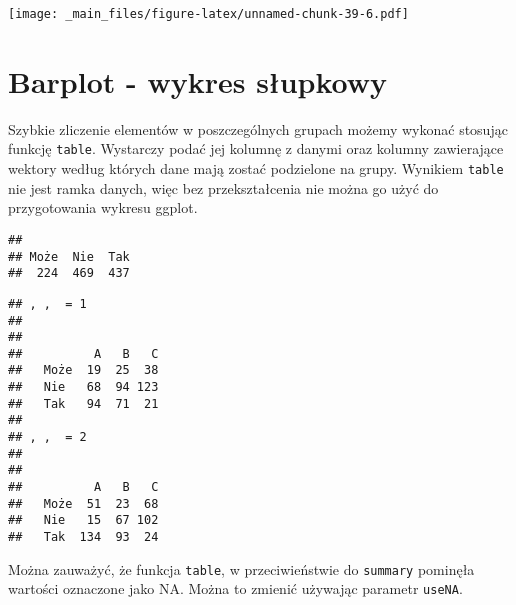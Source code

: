 \documentclass[
]{book}
\newenvironment{Shaded}{\begin{snugshade}}{\end{snugshade}}
\newcommand{\AttributeTok}[1]{\textcolor[rgb]{0.77,0.63,0.00}{#1}}
\newcommand{\FunctionTok}[1]{\textcolor[rgb]{0.00,0.00,0.00}{#1}}
\newcommand{\NormalTok}[1]{#1}
\newcommand{\SpecialCharTok}[1]{\textcolor[rgb]{0.00,0.00,0.00}{#1}}
\newcommand{\StringTok}[1]{\textcolor[rgb]{0.31,0.60,0.02}{#1}}
\begin{document}
\texttt{[image: \_main\_files/figure-latex/unnamed-chunk-39-6.pdf]}

\hypertarget{barplot---wykres-sux142upkowy}{%
\section{Barplot - wykres słupkowy}\label{barplot---wykres-sux142upkowy}}

Szybkie zliczenie elementów w poszczególnych grupach możemy wykonać stosując funkcję \texttt{table}. Wystarczy podać jej kolumnę z danymi oraz kolumny zawierające wektory według których dane mają zostać podzielone na grupy. Wynikiem \texttt{table} nie jest ramka danych, więc bez przekształcenia nie można go użyć do przygotowania wykresu ggplot.

\begin{Shaded}
\end{Shaded}

\begin{verbatim}
## 
## Może  Nie  Tak 
##  224  469  437
\end{verbatim}

\begin{Shaded}
\end{Shaded}

\begin{verbatim}
## , ,  = 1
## 
##       
##          A   B   C
##   Może  19  25  38
##   Nie   68  94 123
##   Tak   94  71  21
## 
## , ,  = 2
## 
##       
##          A   B   C
##   Może  51  23  68
##   Nie   15  67 102
##   Tak  134  93  24
\end{verbatim}

Można zauważyć, że funkcja \texttt{table}, w przeciwieństwie do \texttt{summary} pominęła wartości oznaczone jako NA. Można to zmienić używając parametr \texttt{useNA}.

\begin{Shaded}
\end{Shaded}
\end{document}
